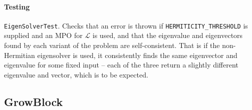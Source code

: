  \paragraph{Testing} \lstinline$EigenSolverTest$. Checks that an error is thrown if \lstinline$HERMITICITY_THRESHOLD$ is supplied and an MPO for \(\mathcal{L}\) is used, and that the eigenvalue and eigenvectors found by each variant of the problem are self-consistent. That is if the non-Hermitian eigensolver is used, it consistently finds the same eigenvector and eigenvalue for some fixed input -- each of the three return a slightly different eigenvalue and vector, which is to be expected.
 
 \subsection{GrowBlock}
